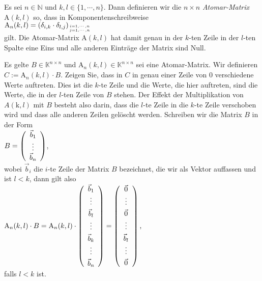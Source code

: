 \begin{Definition}
  Es sei $n\in\mathbb{N}$ und $k,l \in \{1,\cdots,n\}$.  Dann 
  definieren wir die $n \times n$ \emph{Atomar-Matrix} $\mathrm{A}(k,l)$ so, dass in Komponentenschreibweise
  \\[0.2cm]
  \hspace*{1.3cm}
  $\mathrm{A}_n(k,l) = (\delta_{i,k} \cdot \delta_{l,j})_{{i = 1, \cdots, n} \atop {j = 1, \cdots, n}}$
  \\[0.2cm]
  gilt.  Die Atomar-Matrix $\mathrm{A}(k,l)$ hat damit genau in der $k$-ten Zeile in der $l$-ten Spalte eine
  Eins und alle anderen Eintr\"{a}ge der Matrix sind Null.  \eoxs
\end{Definition}
\pagebreak

\exercise
Es gelte $B \in \mathbb{K}^{n \times n}$ und $\mathrm{A}_n(k,l) \in \mathbb{K}^{n \times n}$ sei eine Atomar-Matrix.  
Wir definieren $C := \mathrm{A}_n(k,l) \cdot B$.  Zeigen Sie, dass in $C$ in genau einer Zeile von $0$ verschiedene
Werte auftreten.  Dies ist die $k$-te Zeile und die Werte, die hier auftreten, sind die Werte, die in
der $l$-ten Zeile von $B$ stehen.   Der Effekt der Multiplikation von $A(\mathrm{k},l)$ mit $B$ besteht also darin,
dass die $l$-te Zeile in die $k$-te Zeile verschoben wird und dass alle anderen Zeilen gel\"{o}scht
werden.  Schreiben wir die Matrix $B$ in der Form
\\[0.2cm]
\hspace*{1.3cm}
$B = \left(
  \begin{array}[c]{c}
    \vec{b}_1 \\
    \vdots       \\
    \vec{b}_n 
  \end{array} 
\right)
$, 
\\[0.2cm]
wobei $\vec{b}_i$ die $i$-te Zeile der Matrix $B$ bezeichnet, die wir als Vektor auffassen und
ist $l < k$, dann gilt also
\\[0.2cm]
\hspace*{1.3cm}
$\mathrm{A}_n(k,l) \cdot B = \mathrm{A}_n(k,l) \cdot \left(
  \begin{array}[c]{c}
    \vec{b}_1 \\
    \vdots       \\[0.1cm]
    \vec{b}_l \\
    \vdots       \\[0.1cm]
    \vec{b}_k \\
    \vdots       \\[0.1cm]
    \vec{b}_n 
  \end{array}
\right) = \left(
  \begin{array}[c]{c}
    \vec{0} \\
    \vdots       \\[0.1cm]
    \vec{0}   \\
    \vdots       \\[0.1cm]
    \vec{b}_l \\
    \vdots       \\[0.1cm]
    \vec{0} 
  \end{array}
\right),
$
\\[0.2cm]
falls $l < k$ ist.
\eox

